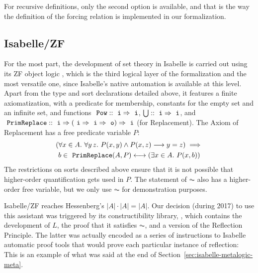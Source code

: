 For recursive definitions, only the second option is available, and
that is the way the definition of the forcing relation is implemented
in our formalization.

\subsection{Isabelle/ZF}
\label{sec:isabellezf}

For the most part, the development of set theory in Isabelle is
carried out using its ZF object logic
\cite{DBLP:journals/jar/PaulsonG96}, which is the third logical layer
of the formalization and the most versatile one, since 
Isabelle's native automation is available at this level. Apart from
the type and sort
declarations detailed above, it features a finite axiomatization,
with a predicate for membership, constants for the empty set and an
infinite set, and functions $\isatt{Pow}::\tyi\fun\tyi$,
$\union::\tyi\fun\tyi$, and $\isatt{PrimReplace} :: \tyi \fun (\tyi
\fun \tyi \fun\tyo)\fun \tyi$ (for Replacement). The Axiom of
Replacement
has a free predicate variable $P$: %
\begin{multline*}
  (\forall x \in A .\ \forall y\, z.\ P(x, y) \wedge P(x, z)
  \longrightarrow y=z) \implies \\
  b \in \isatt{PrimReplace}(A, P)
  \longleftrightarrow(\exists x \in A .\ P(x, b)) 
\end{multline*}
The restrictions on sorts described above ensure that it is not
possible that higher-order quantification gets used in $P$. The
statement of $\AC$ also has a higher-order free variable, but we only
use $\AC$ for demonstration purposes.

Isabelle/ZF reaches Hessenberg's $|A|\cdot|A| = |A|$. Our decision
(during 2017) to
use this assistant was triggered by its constructibility
library,  \citep{paulson_2003},
which contains the development of $L$, the proof that it satisfies
$\AC$, and a version of the Reflection Principle. The latter was
actually encoded as a series of instructions to Isabelle automatic
proof tools that would prove each particular instance of reflection:
This is an example of what was said at the end of Section~\ref{sec:isabelle-metalogic-meta}.

